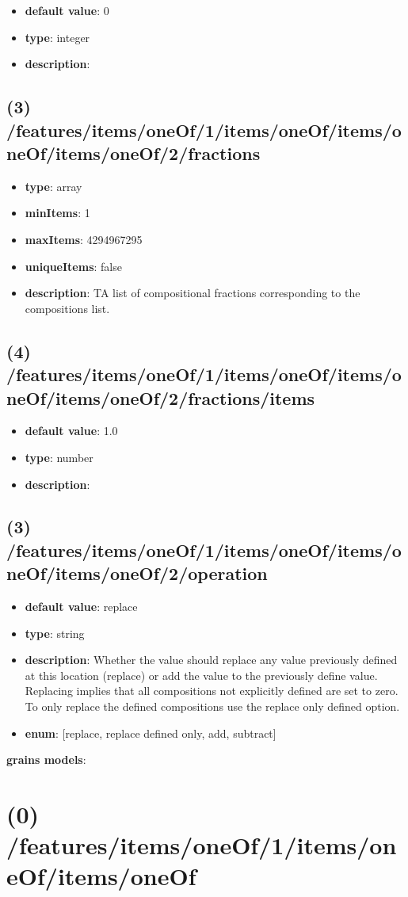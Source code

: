 \begin{itemize}[leftmargin=4em]\item {\bf default value}: 0
\item {\bf type}: integer
\item {\bf description}: 
\end{itemize}\subsection{(3) /features/items/oneOf/1/items/oneOf/items/oneOf/items/oneOf/2/fractions}
\begin{itemize}[leftmargin=3em]\item {\bf type}: array
\item {\bf minItems}: 1
\item {\bf maxItems}: 4294967295
\item {\bf uniqueItems}: false
\item {\bf description}: TA list of compositional fractions corresponding to the compositions list.
\end{itemize}\subsection{(4) /features/items/oneOf/1/items/oneOf/items/oneOf/items/oneOf/2/fractions/items}
\begin{itemize}[leftmargin=4em]\item {\bf default value}: 1.0
\item {\bf type}: number
\item {\bf description}: 
\end{itemize}\subsection{(3) /features/items/oneOf/1/items/oneOf/items/oneOf/items/oneOf/2/operation}
\begin{itemize}[leftmargin=3em]\item {\bf default value}: replace
\item {\bf type}: string
\item {\bf description}: Whether the value should replace any value previously defined at this location (replace) or add the value to the previously define value. Replacing implies that all compositions not explicitly defined are set to zero. To only replace the defined compositions use the replace only defined option.
\item {\bf enum}: [replace, replace defined only, add, subtract]\end{itemize}\item {\bf grains models}: \section{(0) /features/items/oneOf/1/items/oneOf/items/oneOf}
